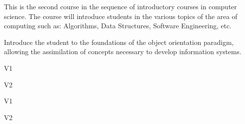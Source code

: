 \begin{syllabus}


\begin{justification}
This is the second course in the sequence of introductory courses in computer science.
The course will introduce students in the various topics of the area of computing such as: Algorithms, Data Structures, Software Engineering, etc.
\end{justification}

\begin{goals}
\item Introduce the student to the foundations of the object orientation paradigm, allowing the assimilation of concepts necessary to develop information systems.
\end{goals}

\begin{outcomes}{V1}
    \item {}
    \item {}
    \item {}
\end{outcomes}

\begin{outcomes}{V2}
    \item {}
    \item {}
    \item {}
\end{outcomes}

\begin{competences}{V1}
    \item {} 
    \item {} 
    \item {}
    \item {}
\end{competences}

\begin{competences}{V2}
    \item {} 
    \item {} 
    \item {}
    \item {}
\end{competences}


\end{syllabus}

